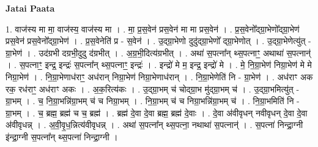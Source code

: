 \documentclass[17pt]{extarticle}
\begin{document}
\textbf{Jatai Paata} \newline

1. वाज॑स्य मा मा॒ वाज॑स्य॒ वाज॑स्य मा । . मा॒ प्र॒स॒वेन॑ प्रस॒वेन॑ मा मा प्रस॒वेन॑ । . प्र॒स॒वेनो᳚द्ग्रा॒भेणो᳚द्ग्रा॒भेण॑ प्रस॒वेन॑ प्रस॒वेनो᳚द्ग्रा॒भेण॑ । . प्र॒स॒वेनेति॑ प्र - स॒वेन॑ । . उ॒द्ग्रा॒भेणो दुदु॑द्ग्रा॒भेणो᳚ द्ग्रा॒भेणोत् । . उ॒द्ग्रा॒भेणेत्यु॑त् - ग्रा॒भेण॑ । . उद॑ग्रभी दग्रभी॒दुदु द॑ग्रभीत् । . अ॒ग्र॒भी॒दित्य॑ग्रभीत् । . अथा॑ स॒पत्ना᳚न् थ्स॒पत्नाꣳ॒॒ अथाथा॑ स॒पत्नान्॑ । . स॒पत्नाꣳ॒॒ इन्द्र॒ इन्द्रः॑ स॒पत्ना᳚न् थ्स॒पत्नाꣳ॒॒ इन्द्रः॑ । . इन्द्रो॑ मे म॒ इन्द्र॒ इन्द्रो॑ मे । . मे॒ नि॒ग्रा॒भेण॑ निग्रा॒भेण॑ मे मे निग्रा॒भेण॑ । . नि॒ग्रा॒भेणाध॑राꣳ॒॒ अध॑रान् निग्रा॒भेण॑ निग्रा॒भेणाध॑रान् । . नि॒ग्रा॒भेणेति॑ नि - ग्रा॒भेण॑ । . अध॑राꣳ अक रक॒ रध॑राꣳ॒॒ अध॑राꣳ अकः । . अ॒क॒रित्य॑कः । . उ॒द्ग्रा॒भम् च॑ चोद्ग्रा॒भ मु॑द्ग्रा॒भम् च॑ । . उ॒द्ग्रा॒भमित्यु॑त् - ग्रा॒भम् । . च॒ नि॒ग्रा॒भन्नि॑ग्रा॒भम् च॑ च निग्रा॒भम् । . नि॒ग्रा॒भम् च॑ च निग्रा॒भन्नि॑ग्रा॒भम् च॑ । . नि॒ग्रा॒भमिति॑ नि - ग्रा॒भम् । . च॒ ब्रह्म॒ ब्रह्म॑ च च॒ ब्रह्म॑ । . ब्रह्म॑ दे॒वा दे॒वा ब्रह्म॒ ब्रह्म॑ दे॒वाः । . दे॒वा अ॑वीवृधन् नवीवृधन् दे॒वा दे॒वा अ॑वीवृधन्न् । . अ॒वी॒वृ॒ध॒न्नित्य॑वीवृधन्न् । . अथा॑ स॒पत्ना᳚न् थ्स॒पत्ना॒ नथाथा॑ स॒पत्नान्॑ । . स॒पत्ना॑ निन्द्रा॒ग्नी इ॑न्द्रा॒ग्नी स॒पत्ना᳚न् थ्स॒पत्ना॑ निन्द्रा॒ग्नी । \newline
\end{document}
